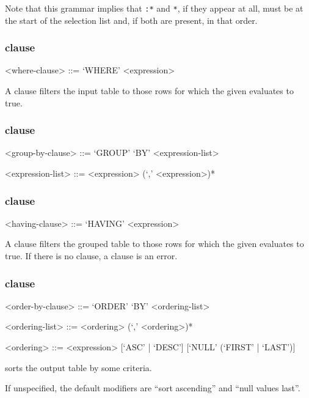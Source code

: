 \documentclass{article}
\begin{document}
Note that this grammar implies that \lstinline|:*| and \lstinline|*|,
if they appear at all, must be at the start of the selection list and,
if both are present, in that order.

\subsubsection{ clause}
\begin{grammar}
<where-clause> ::= `WHERE' <expression>
\end{grammar}

A  clause filters the input table to those rows for which
the given  evaluates to true.

\subsubsection{ clause}
\begin{grammar}
<group-by-clause> ::= `GROUP' `BY' <expression-list>

<expression-list> ::= <expression> (`,' <expression>)*
\end{grammar}

\subsubsection{ clause}
\begin{grammar}
<having-clause> ::= `HAVING' <expression>
\end{grammar}

A  clause filters the grouped table to those rows for
which the given  evaluates to true.  If there is
no  clause, a  clause is an error.

\subsubsection{ clause}
\begin{grammar}
<order-by-clause> ::= `ORDER' `BY' <ordering-list>

<ordering-list> ::= <ordering> (`,' <ordering>)*

<ordering> ::= <expression> [`ASC' | `DESC'] [`NULL' (`FIRST' | `LAST')]
\end{grammar}

 sorts the output table by some criteria.

If unspecified, the default modifiers are ``sort ascending'' and
``null values last''.
\end{document}
